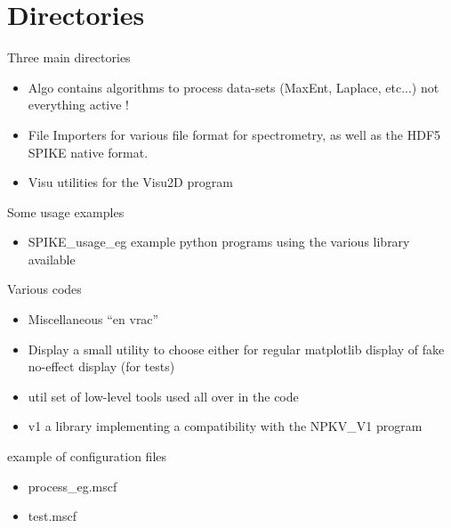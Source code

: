 \documentclass[letterpaper,10pt,openany,oneside]{sphinxmanual}
\begin{document}
\section{Directories}
\label{rst/introduction:directories}
Three main directories
\begin{itemize}
\item {} 
Algo contains algorithms to process data-sets (MaxEnt, Laplace, etc...) not everything active !

\item {} 
File Importers for various file format for spectrometry, as well as the HDF5 SPIKE native format.

\item {} 
Visu utilities for the Visu2D program

\end{itemize}

Some usage examples
\begin{itemize}
\item {} 
SPIKE\_usage\_eg example python programs using the various library available

\end{itemize}

Various codes
\begin{itemize}
\item {} 
Miscellaneous ``en vrac''

\item {} 
Display a small utility to choose either for regular matplotlib display of fake no-effect display (for tests)

\item {} 
util set of low-level tools used all over in the code

\item {} 
v1 a library implementing a compatibility with the NPKV\_V1 program

\end{itemize}

example of configuration files
\begin{itemize}
\item {} 
process\_eg.mscf

\item {} 
test.mscf

\end{itemize}
\end{document}
